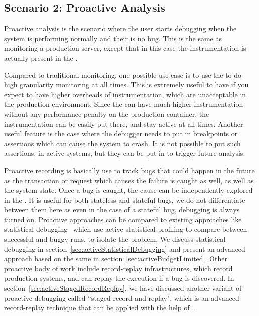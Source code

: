 \subsection{Scenario 2: Proactive Analysis}
\label{sec:activeProactiveAnalysis}

Proactive analysis is the scenario where the user starts debugging when the system is performing normally and their is no bug. 
This is the same as monitoring a production server, except that in this case the instrumentation is actually present in the \debugcontainer.

Compared to traditional monitoring, one possible use-case is to use the \debugcontainer to do high granularity monitoring at all times. 
This is extremely useful to have if you expect to have higher overheads of instrumentation, which are unacceptable in the production environment. 
Since the \debugcontainer can have much higher instrumentation without any performance penalty on the production container, the instrumentation can be easily put there, and stay active at all times.
Another useful feature is the case where the debugger needs to put in breakpoints or assertions which can cause the system to crash. 
It is not possible to put such assertions, in active systems, but they can be put in \debugcontainer to trigger future analysis.

Proactive recording is basically use to track bugs that could happen in the future as the transaction or request which causes the failure is caught as well, as well as the system state. 
Once a bug is caught, the cause can be independently explored in the \debugcontainer.
It is useful for both stateless and stateful bugs, we do not differentiate between them here as even in the case of a stateful bug, debugging is always turned on. 
Proactive approaches can be compared to existing approaches like statistical debugging~\cite{statisticalDebugging} which use active statistical profiling to compare between successful and buggy runs, to isolate the problem. 
We discuss statistical debugging in section~\ref{sec:activeStatisticalDebugging} and present an advanced approach based on the same in section~\ref{sec:activeBudgetLimited}.
Other proactive body of work include record-replay infrastructures, which record production systems, and can replay the execution if a bug is discovered.
In section~\ref{sec:activeStagedRecordReplay}, we have discussed another variant of proactive debugging called ``staged record-and-replay", which is an advanced record-replay technique that can be applied with the help of \parikshan.



